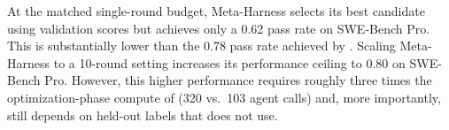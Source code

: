 At the matched single-round budget, Meta-Harness selects its best candidate using validation scores but achieves only a 0.62 pass rate on SWE-Bench Pro.
This is substantially lower than the 0.78 pass rate achieved by \method{}.
Scaling Meta-Harness to a 10-round setting increases its performance ceiling to 0.80 on SWE-Bench Pro.
However, this higher performance requires roughly three times the optimization-phase compute of \method{} (320 vs.\ 103 agent calls) and, more importantly, still depends on held-out labels that \method{} does not use.
